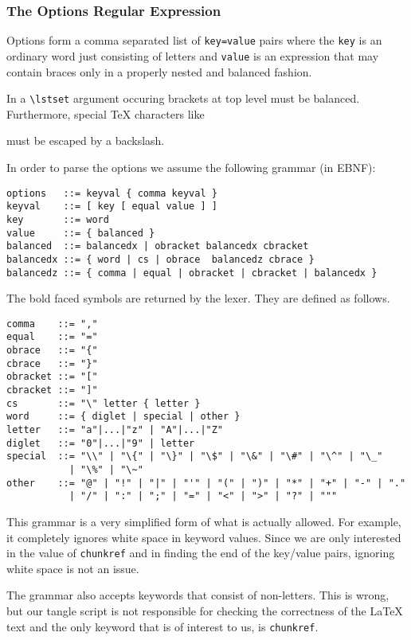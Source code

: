 \documentclass[a4paper]{article} %
\begin{document}
\subsubsection{The Options Regular Expression}
Options form a comma separated list of \texttt{key=value} pairs where
the \texttt{key} is an ordinary word just consisting of letters and
\texttt{value} is an expression that may contain braces only in a
properly nested and balanced fashion.

In a \verb'\lstset' argument occuring brackets at top level
must be balanced. Furthermore, special \TeX{} characters like
\begin{myverbatim}
  \ { } $ & # ^ _ %
\end{myverbatim}
must be escaped by a backslash.

In order to parse the options we assume the following grammar (in
EBNF):
\begin{lstlisting}[keywords={comma, equal, word, cs, obrace, cbrace,
    obracket, cbracket}, label=grammar]
options   ::= keyval { comma keyval }
keyval    ::= [ key [ equal value ] ]
key       ::= word
value     ::= { balanced }
balanced  ::= balancedx | obracket balancedx cbracket
balancedx ::= { word | cs | obrace  balancedz cbrace }
balancedz ::= { comma | equal | obracket | cbracket | balancedx }
\end{lstlisting}
The bold faced symbols are returned by the lexer. They are defined as
follows.
\begin{lstlisting}[string={[d]"},stringstyle=\ttfamily]
comma    ::= ","
equal    ::= "="
obrace   ::= "{"
cbrace   ::= "}"
obracket ::= "["
cbracket ::= "]"
cs       ::= "\" letter { letter }
word     ::= { diglet | special | other }
letter   ::= "a"|...|"z" | "A"|...|"Z"
diglet   ::= "0"|...|"9" | letter
special  ::= "\\" | "\{" | "\}" | "\$" | "\&" | "\#" | "\^" | "\_"
           | "\%" | "\~"
other    ::= "@" | "!" | "|" | "'" | "(" | ")" | "*" | "+" | "-" | "."
           | "/" | ":" | ";" | "=" | "<" | ">" | "?" | """
\end{lstlisting}
This grammar is a very simplified form of what is actually allowed.
For example, it completely ignores white space in keyword values.
Since we are only interested in the value of \texttt{chunkref} and in
finding the end of the key/value pairs, ignoring white space is not an
issue.

The grammar also accepts keywords that consist of non-letters. This is
wrong, but our tangle script is not responsible for checking the
correctness of the \LaTeX{} text and the only keyword that is of
interest to us, is \texttt{chunkref}.
\end{document}

